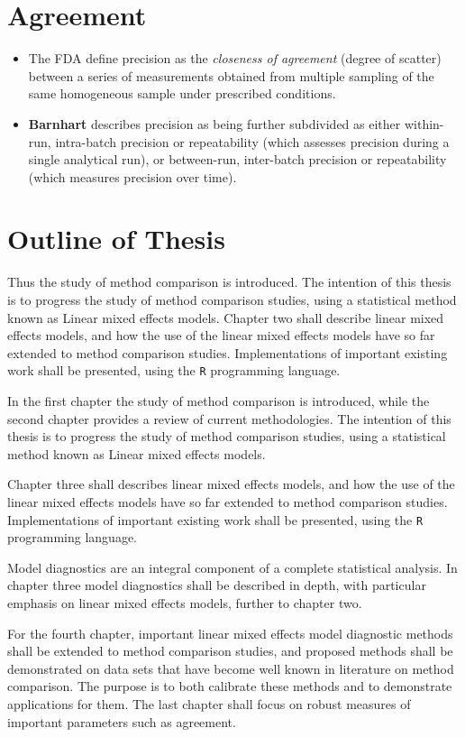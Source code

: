 \documentclass[12pt, a4paper]{report}
\theoremstyle{plain}
\theoremstyle{definition}
\theoremstyle{remark}
\begin{document}
	


	\section{Agreement}
	\begin{itemize}
		\item The FDA define precision as the \textit{closeness of agreement} (degree of
		scatter) between a series of measurements obtained from multiple
		sampling of the same homogeneous sample under prescribed
		conditions. 
		\item \textbf{Barnhart} describes precision as being further
		subdivided as either within-run, intra-batch precision or
		repeatability (which assesses precision during a single analytical
		run), or between-run, inter-batch precision or repeatability
		(which measures precision over time).
	\end{itemize}
	

	\section{Outline of Thesis}
	Thus the study of method comparison is introduced. The intention of this thesis is to progress the
	study of method comparison studies, using a statistical method known as Linear mixed effects models.
	Chapter two shall describe linear mixed effects models, and how the use of the linear mixed
	effects models have so far extended to method comparison studies. Implementations of important existing work shall be presented, using the \texttt{R} programming language.
	
	In the first chapter the study of method comparison is introduced, while the second chapter provides a review of current methodologies. The intention of this thesis is to progress the study of method comparison studies, using a statistical method known as Linear mixed effects models.
	
	Chapter three shall describes linear mixed effects models, and how the use of the linear mixed effects models have so far extended to method comparison studies. Implementations of important existing work shall be presented, using the \texttt{R} programming language.
	
	Model diagnostics are an integral component of a complete statistical analysis.
	In chapter three model diagnostics shall be described in depth, with particular
	emphasis on linear mixed effects models, further to chapter two.
	
	For the fourth chapter, important linear mixed effects model diagnostic methods shall be extended to method comparison studies, and proposed methods shall be demonstrated on data sets that have become well known in literature on method comparison. The purpose is to both calibrate these methods and to demonstrate applications for them.
	The last chapter shall focus on robust measures of important parameters such as agreement.
	
\end{document}
